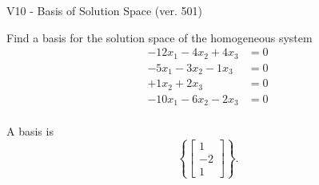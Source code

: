 \begin{exercise}
  \begin{exerciseTitle}V10 - Basis of Solution Space (ver. 501)\end{exerciseTitle}
  \begin{exerciseStatement}
    Find a basis for the solution space of the homogeneous system 
\begin{align*}
 -12 x_ 1 -4 x_ 2 + 4 x_ 3 &= 0  \\ 
  -5 x_ 1 -3 x_ 2 -1 x_ 3 &= 0  \\ 
  + 1 x_ 2 + 2 x_ 3 &= 0  \\ 
  -10 x_ 1 -6 x_ 2 -2 x_ 3 &= 0  \\ 
 \end{align*}


 
  \end{exerciseStatement}

  \begin{exerciseAnswer}
   A basis is   
\[\left\{\left[\begin{array}{c}
1 \\
-2 \\
1
\end{array}\right]\right\}.\]

  


  \end{exerciseAnswer}
\end{exercise}